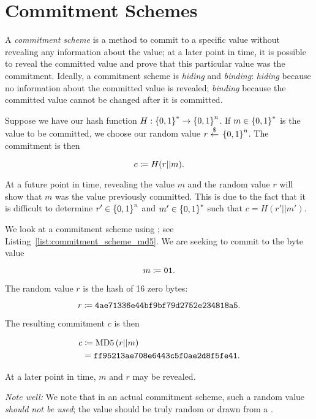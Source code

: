 \section{Commitment Schemes}

A \emph{commitment scheme} is a method to commit to a specific value
without revealing any information about the value;
at a later point in time, it is possible to reveal the committed
value and prove that this particular value was the commitment.
Ideally, a commitment scheme is \emph{hiding} and \emph{binding}:
\emph{hiding} because no information about the committed value is revealed;
\emph{binding} because the committed value cannot be changed after
it is committed.

Suppose we have our \gls{hash function} $H:\left\{ 0,1 \right\}^{*}\to\left\{ 0,1 \right\}^{n}$.
If $m\in\left\{ 0,1 \right\}^{*}$ is the value to be committed,
we choose our random value $r\stackrel{\$}{\leftarrow}{}\left\{ 0,1 \right\}^{n}$.
The commitment is then

\begin{equation}
    c \coloneqq{} H(r||m).
\end{equation}

\noindent
At a future point in time, revealing the value $m$ and the random value $r$
will show that $m$ was the value previously committed.
This is due to the fact that it is difficult to determine
$r'\in\left\{ 0,1 \right\}^{n}$ and $m'\in\left\{ 0,1 \right\}^{*}$
such that $c = H(r'||m')$.

\begin{example}

We look at a commitment scheme using \MDFive{};
see Listing~\ref{list:commitment_scheme_md5}.
We are seeking to commit to the byte value

\begin{equation}
    m \coloneqq{} \texttt{01}.
\end{equation}

\noindent
The random value $r$ is the \MDFive{} hash of 16 zero bytes:

\begin{equation}
    r \coloneqq{} \texttt{4ae71336e44bf9bf79d2752e234818a5}.
\end{equation}

\noindent
The resulting commitment $c$ is then

\begin{align}
    c &\coloneqq{} \text{MD5{}}\left( r||m \right) \nonumber\\
        &= \texttt{ff95213ae708e6443c5f0ae2d8f5fe41}.
\end{align}

\noindent
At a later point in time, $m$ and $r$ may be revealed.



\emph{Note well:} We note that in an actual commitment scheme,
such a random value \emph{should not be used};
the value should be truly random or drawn from a .
\end{example}

